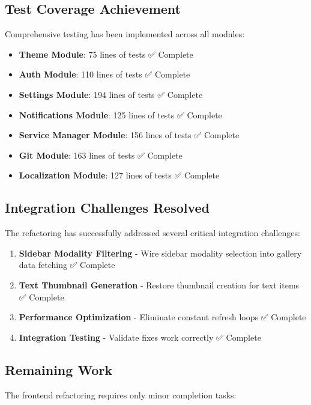 \documentclass[11pt]{article}
\begin{document}
\subsection{Test Coverage Achievement}

Comprehensive testing has been implemented across all modules:

\begin{itemize}
\item \textbf{Theme Module}: 75 lines of tests ✅ Complete
\item \textbf{Auth Module}: 110 lines of tests ✅ Complete
\item \textbf{Settings Module}: 194 lines of tests ✅ Complete
\item \textbf{Notifications Module}: 125 lines of tests ✅ Complete
\item \textbf{Service Manager Module}: 156 lines of tests ✅ Complete
\item \textbf{Git Module}: 163 lines of tests ✅ Complete
\item \textbf{Localization Module}: 127 lines of tests ✅ Complete
\end{itemize}

\subsection{Integration Challenges Resolved}

The refactoring has successfully addressed several critical integration challenges:

\begin{enumerate}
\item \textbf{Sidebar Modality Filtering} - Wire sidebar modality selection into gallery data fetching ✅ Complete
\item \textbf{Text Thumbnail Generation} - Restore thumbnail creation for text items ✅ Complete
\item \textbf{Performance Optimization} - Eliminate constant refresh loops ✅ Complete
\item \textbf{Integration Testing} - Validate fixes work correctly ✅ Complete
\end{enumerate}

\subsection{Remaining Work}

The frontend refactoring requires only minor completion tasks:
\end{document}
